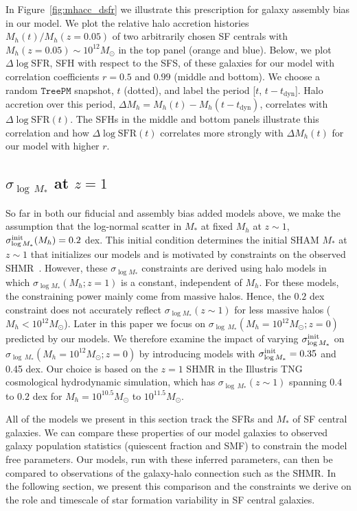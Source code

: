 \documentclass[12pt, letterpaper, preprint, tighten]{aastex62}
\newcommand{\edt}[1]{{\color{dred}{\bf} #1}}
\newcommand{\logsfr}{\log\mathrm{SFR}}
\newcommand{\siglogm}{\sigma_{\log M_*}}
\begin{document}
In Figure~\ref{fig:mhacc_dsfr} we illustrate this prescription for galaxy
assembly bias in our model. We plot the relative halo accretion histories
$M_h(t)/M_h(z{=}0.05)$ of two arbitrarily chosen SF centrals with
$M_h(z{=}0.05)\sim10^{12}M_\odot$ in the top panel (orange and blue). Below, we plot
$\Delta\logsfr$, SFH with respect to the SFS, of these galaxies for our model with
correlation coefficients $r=0.5$ and $0.99$ (middle and bottom). We choose a
random $\mathtt{TreePM}$ snapshot, $t$ (dotted), and label the period
[$t$, $t - t_\mathrm{dyn}$]. Halo accretion over this period,
$\Delta M_h = M_h(t) - M_h(t-t_\mathrm{dyn})$, correlates with $\Delta\logsfr(t)$.
The SFHs in the middle and bottom panels illustrate this correlation and how
$\Delta\logsfr(t)$ correlates more strongly with $\Delta M_h(t)$ for our model
with higher $r$.

\subsection{\edt{$\sigma_{\log\,M_*}$ at $z=1$}} \label{sec:siglogminit}
\edt{So far in both our fiducial and assembly bias added models above, we make the
assumption that the log-normal scatter in $M_*$ at fixed $M_h$ at $z\sim1$,
$\siglogm^{\rm init}(M_h) = 0.2$ dex. This initial condition determines
the initial SHAM $M_*$ at $z\sim1$ that initializes our models and is motivated
by constraints on the observed SHMR~\citep[\emph{e.g.}][]{leauthaud2012, tinker2013, patel2015}. 
However, these $\siglogm$ constraints are derived using halo models
in which $\siglogm(M_h; z = 1)$ is a constant, independent of $M_h$.
For these models, the constraining power mainly come from massive halos.
Hence, the $0.2$ dex constraint does not accurately reflect $\siglogm(z\sim1)$
for less massive halos ($M_h < 10^{12}M_\odot$).
Later in this paper we focus on $\sigma_{\log\,M_*}(M_h=10^{12}M_\odot; z=0)$
predicted by our models. We therefore examine the impact of varying
$\siglogm^{\rm init}$ on $\sigma_{\log\,M_*}(M_h=10^{12}M_\odot; z=0)$
by introducing models with $\siglogm^{\rm init} = 0.35$ and 0.45 dex.
Our choice is based on the $z=1$ SHMR in the Illustris TNG~\citep{pillepich2018}
cosmological hydrodynamic simulation, which has $\sigma_{\log\,M_*}(z\sim1)$
spanning $0.4$ to $0.2$ dex for $M_h = 10^{10.5}M_\odot$ to $10^{11.5}M_\odot$.}

\edt{All of the models we present in this section track the SFRs and $M_*$ of SF
central galaxies. We can compare these properties of our model galaxies
to observed galaxy population statistics (quiescent fraction and SMF) to
constrain the model free parameters.}
Our models, run with these inferred
parameters, can then be compared to observations of the galaxy-halo connection
such as the SHMR. In the following section, we present this comparison and
the constraints we derive on the role and timescale of star formation
variability in SF central galaxies.
\end{document}
